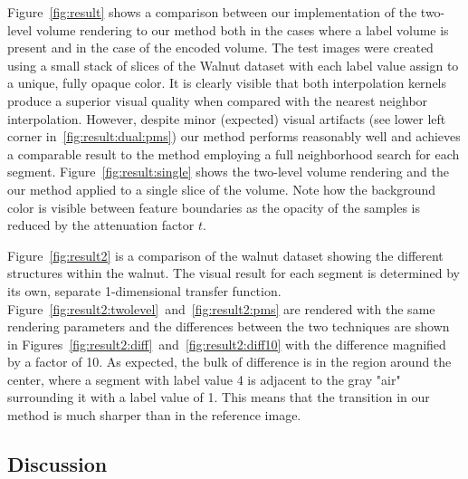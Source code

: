 \documentclass{egpubl}
\begin{document}
Figure~\ref{fig:result} shows a comparison between our implementation of the two-level volume rendering to our method both in the cases where a label volume is present and in the case of the encoded volume. The test images were created using a small stack of slices of the Walnut dataset with each label value assign to a unique, fully opaque color. It is clearly visible that both interpolation kernels produce a superior visual quality when compared with the nearest neighbor interpolation. However, despite minor (expected) visual artifacts (see lower left corner in~\ref{fig:result:dual:pms}) our method performs reasonably well and achieves a comparable result to the method employing a full neighborhood search for each segment. Figure~\ref{fig:result:single} shows the two-level volume rendering and the our method applied to a single slice of the volume. Note how the background color is visible between feature boundaries as the opacity of the samples is reduced by the attenuation factor $t$.

Figure~\ref{fig:result2} is a comparison of the walnut dataset showing the different structures within the walnut. The visual result for each segment is determined by its own, separate 1-dimensional transfer function. Figure~\ref{fig:result2:twolevel}~and~\ref{fig:result2:pms} are rendered with the same rendering parameters and the differences between the two techniques are shown in Figures~\ref{fig:result2:diff}~and~\ref{fig:result2:diff10} with the difference magnified by a factor of 10. As expected, the bulk of difference is in the region around the center, where a segment with label value 4 is adjacent to the gray "air" surrounding it with a label value of 1. This means that the transition in our method is much sharper than in the reference image.





\subsection{Discussion}
\end{document}
